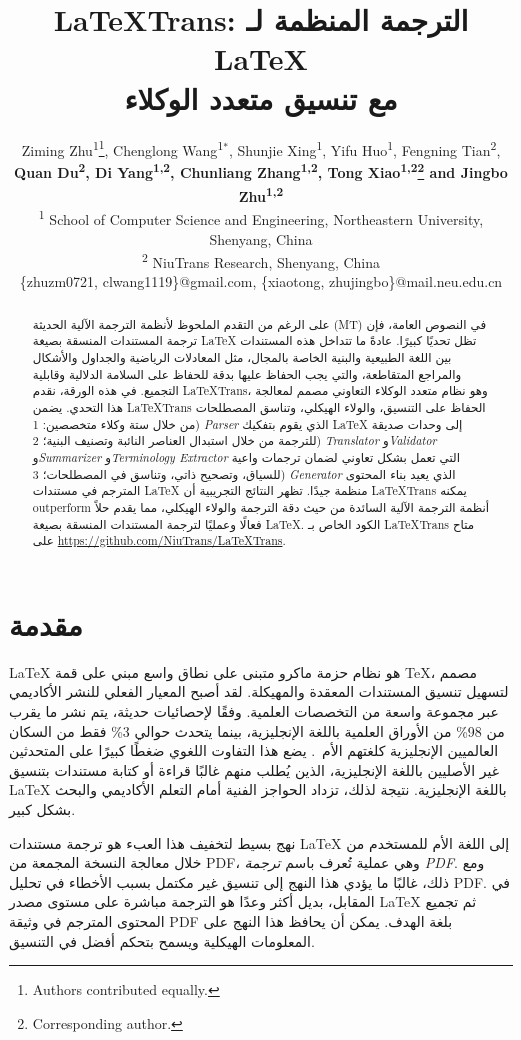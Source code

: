 \documentclass[11pt]{article}
\title{LaTeXTrans: الترجمة المنظمة لـ LaTeX \\ مع تنسيق متعدد الوكلاء}
\author{
    Ziming Zhu\textsuperscript{\rm 1}\thanks{Authors contributed equally.},
    Chenglong Wang\textsuperscript{\rm 1}$^{*}$,
    Shunjie Xing\textsuperscript{\rm 1},
    Yifu Huo\textsuperscript{\rm 1},
    Fengning Tian\textsuperscript{\rm 2}, \\
    \textbf{Quan Du\textsuperscript{\rm 2},
    Di Yang\textsuperscript{\rm 1,2},
    Chunliang Zhang\textsuperscript{\rm 1,2},
    Tong Xiao\textsuperscript{\rm 1,2}\thanks{Corresponding author.}
    and
    Jingbo Zhu\textsuperscript{\rm 1,2}} \\
    \textsuperscript{\rm 1} School of Computer Science and Engineering, Northeastern University, Shenyang, China \\
    \textsuperscript{\rm 2} NiuTrans Research, Shenyang, China \\
    {\{zhuzm0721, clwang1119\}@gmail.com},
    {\{xiaotong, zhujingbo\}@mail.neu.edu.cn}
}
\begin{document}
\maketitle

\begin{abstract}
على الرغم من التقدم الملحوظ لأنظمة الترجمة الآلية الحديثة (MT) في النصوص العامة، فإن ترجمة المستندات المنسقة بصيغة LaTeX تظل تحديًا كبيرًا. عادةً ما تتداخل هذه المستندات بين اللغة الطبيعية والبنية الخاصة بالمجال، مثل المعادلات الرياضية والجداول والأشكال والمراجع المتقاطعة، والتي يجب الحفاظ عليها بدقة للحفاظ على السلامة الدلالية وقابلية التجميع. في هذه الورقة، نقدم LaTeXTrans، وهو نظام متعدد الوكلاء التعاوني مصمم لمعالجة هذا التحدي. يضمن LaTeXTrans الحفاظ على التنسيق، والولاء الهيكلي، وتناسق المصطلحات من خلال ستة وكلاء متخصصين: 1) \textit{Parser} الذي يقوم بتفكيك LaTeX إلى وحدات صديقة للترجمة من خلال استبدال العناصر النائبة وتصنيف البنية؛ 2) \textit{Translator} و\textit{Validator} و\textit{Summarizer} و\textit{Terminology Extractor} التي تعمل بشكل تعاوني لضمان ترجمات واعية للسياق، وتصحيح ذاتي، وتناسق في المصطلحات؛ 3) \textit{Generator} الذي يعيد بناء المحتوى المترجم في مستندات LaTeX منظمة جيدًا. تظهر النتائج التجريبية أن LaTeXTrans يمكنه outperform أنظمة الترجمة الآلية السائدة من حيث دقة الترجمة والولاء الهيكلي، مما يقدم حلاً فعالًا وعمليًا لترجمة المستندات المنسقة بصيغة LaTeX. الكود الخاص بـ LaTeXTrans متاح على \url{https://github.com/NiuTrans/LaTeXTrans}.
\end{abstract}
\section{مقدمة}
LaTeX هو نظام حزمة ماكرو متبنى على نطاق واسع مبني على قمة TeX، مصمم لتسهيل تنسيق المستندات المعقدة والمهيكلة. لقد أصبح المعيار الفعلي للنشر الأكاديمي عبر مجموعة واسعة من التخصصات العلمية. وفقًا لإحصائيات حديثة، يتم نشر ما يقرب من 98\% من الأوراق العلمية باللغة الإنجليزية، بينما يتحدث حوالي 3\% فقط من السكان العالميين الإنجليزية كلغتهم الأم~\citep{kleidermacher2025sciencelanguagesassessingllm}. يضع هذا التفاوت اللغوي ضغطًا كبيرًا على المتحدثين غير الأصليين باللغة الإنجليزية، الذين يُطلب منهم غالبًا قراءة أو كتابة مستندات بتنسيق LaTeX باللغة الإنجليزية. نتيجة لذلك، تزداد الحواجز الفنية أمام التعلم الأكاديمي والبحث بشكل كبير.

نهج بسيط لتخفيف هذا العبء هو ترجمة مستندات LaTeX إلى اللغة الأم للمستخدم من خلال معالجة النسخة المجمعة من PDF، وهي عملية تُعرف باسم \textit{ترجمة PDF}. ومع ذلك، غالبًا ما يؤدي هذا النهج إلى تنسيق غير مكتمل بسبب الأخطاء في تحليل PDF. في المقابل، بديل أكثر وعدًا هو الترجمة مباشرة على مستوى مصدر LaTeX ثم تجميع المحتوى المترجم في وثيقة PDF بلغة الهدف. يمكن أن يحافظ هذا النهج على المعلومات الهيكلية ويسمح بتحكم أفضل في التنسيق.
\end{document}
